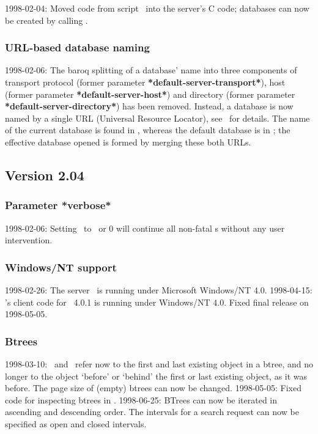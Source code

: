 1998-02-04: Moved code from script \ into the
server's C code; databases can now be created by calling
.

\subsubsection{URL-based database naming}

1998-02-06: The baroq splitting of a database' name into three
components of transport protocol (former parameter
\textbf{*default-server-transport*}), host (former parameter
\textbf{*default-server-host*}) and directory (former parameter
\textbf{*default-server-directory*}) has been removed. Instead, a
database is now named by a single URL (Universal Resource Locator),
see \ for details. The name of the current database is
found in , whereas the default database is in
; the effective database opened is
formed by merging these both URLs.

\subsection{Version 2.04}

\subsubsection{Parameter *verbose*}

1998-02-06: Setting \ to \lispnil\ or 0 will continue
all non-fatal s without any user intervention.

\subsubsection{Windows/NT support}

1998-02-26: The server \ is running under Microsoft
Windows/NT 4.0.  1998-04-15: \plobwoexcl's client code for \lwcl\ 
4.0.1 is running under Windows/NT 4.0. Fixed final release on
1998-05-05.

\subsubsection{Btrees}

1998-03-10: \ and \ 
refer now to the first and last existing object in a btree, and no
longer to the object `before' or `behind' the first or last
existing object, as it was before. The page size of (empty) btrees can
now be changed.  1998-05-05: Fixed code for inspecting btrees in
\lwcl.  1998-06-25: BTrees can now be iterated in ascending and
descending order. The intervals for a search request can now be
specified as open and closed intervals.

